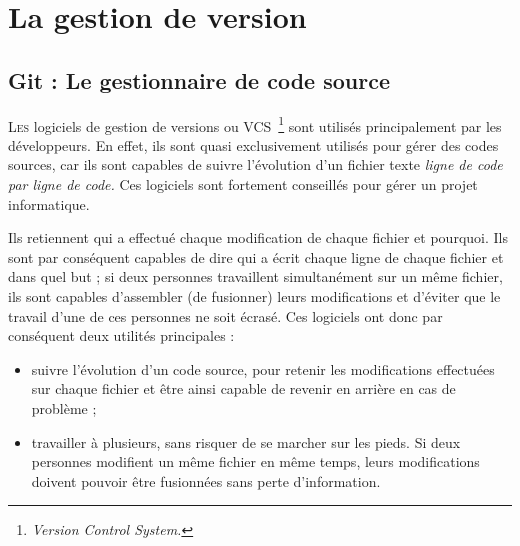 \chapter{La gestion de version} %
\label{cha:La gestion de version}

\section{Git : Le gestionnaire de code source} %
\label{sec:Git : Le gestionnaire de code source}

\lettrine{L}{es} logiciels de gestion de versions ou VCS\,
\footnote{\emph{Version Control System.}} sont utilisés principalement par les
développeurs. En effet, ils sont quasi exclusivement utilisés pour gérer des
codes sources, car ils sont capables de suivre l’évolution d’un fichier texte
\emph{ligne de code par ligne de code.} Ces logiciels sont fortement conseillés
pour gérer un projet informatique.

Ils retiennent qui a effectué chaque modification de chaque fichier et
pourquoi. Ils sont par conséquent capables de dire qui a écrit chaque ligne de
chaque fichier et dans quel but ; si deux personnes travaillent simultanément
sur un même fichier, ils sont capables d’assembler (de fusionner) leurs
modifications et d’éviter que le travail d’une de ces personnes ne soit écrasé.
Ces logiciels ont donc par conséquent deux utilités principales :

\begin{itemize}
    \item suivre l’évolution d’un code source, pour retenir les modifications
    effectuées sur chaque fichier et être ainsi capable de revenir en arrière en
    cas de problème ;
    \item travailler à plusieurs, sans risquer de se marcher sur les pieds.
    Si deux personnes modifient un même fichier en même temps, leurs modifications
    doivent pouvoir être fusionnées sans perte d’information.
\end{itemize}


